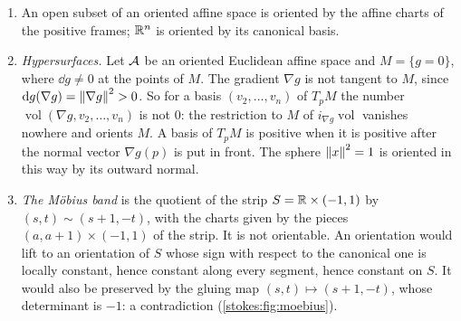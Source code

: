 \begin{notechapter}
\begin{example}\label{stokes:ex:orientations}
\begin{enumerate}[nosep]
  \item An open subset of an oriented affine space is oriented by the
        affine charts of the positive frames; $\mathbb{R}^n$ is oriented by its
        canonical basis.
  \item \emph{Hypersurfaces.} Let $\mathcal{A}$ be an oriented Euclidean
        affine space and $M = \{g = 0\}$, where $\dd g\neq0$ at the
        points of $M$. The gradient $\nabla g$ is not tangent to $M$,
        since $\mathrm{d} g(\nabla g) = \left\|\nabla g\right\|^2 > 0$. So for a basis
        $(v_2,\dots,v_n)$ of $T_pM$ the number
        $\operatorname{vol}(\nabla g, v_2,\dots,v_n)$ is not $0$: the
        restriction to $M$ of $i_{\nabla g}\operatorname{vol}$ vanishes
        nowhere and orients $M$. A basis of $T_pM$ is positive when it
        is positive after the normal vector $\nabla g(p)$ is put in
        front. The sphere $\left\|x\right\|^2 = 1$ is oriented in this way by
        its outward normal.
  \item \emph{The M\"obius band} is the quotient of the strip
        $S = \mathbb{R}\times(-1, 1)$ by $(s, t)\sim(s + 1, -t)$, with the
        charts given by the pieces $(a, a + 1)\times(-1, 1)$ of the
        strip. It is not orientable. An orientation would lift to an
        orientation of $S$ whose sign with respect to the canonical one
        is locally constant, hence constant along every segment, hence
        constant on $S$. It would also be preserved by the gluing map
        $(s, t)\mapsto(s + 1, -t)$, whose determinant is $-1$: a
        contradiction (\cref{stokes:fig:moebius}).
\end{enumerate}
\end{example}


\end{notechapter}
